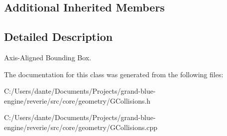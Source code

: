\subsection*{Additional Inherited Members}


\subsection{Detailed Description}
Axis-\/\+Aligned Bounding Box. 

The documentation for this class was generated from the following files\+:\begin{DoxyCompactItemize}
\item 
C\+:/\+Users/dante/\+Documents/\+Projects/grand-\/blue-\/engine/reverie/src/core/geometry/G\+Collisions.\+h\item 
C\+:/\+Users/dante/\+Documents/\+Projects/grand-\/blue-\/engine/reverie/src/core/geometry/G\+Collisions.\+cpp\end{DoxyCompactItemize}
